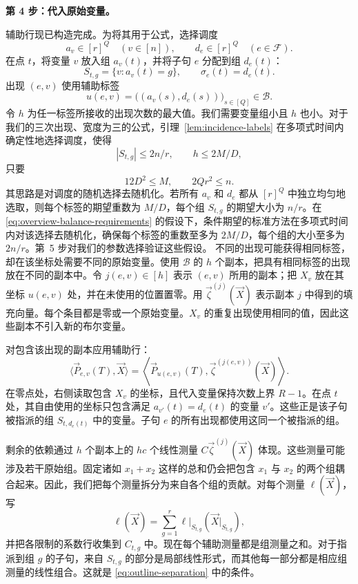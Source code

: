 \documentclass[11pt,reqno]{amsart}
\numberwithin{equation}{section}
\theoremstyle{definition}\newtheorem{definition}[theorem]{定义}
\theoremstyle{remark}\newtheorem{remark}[theorem]{注}
\renewcommand{\le}{\leqslant}
\begin{document}
\medskip\noindent
\textbf{第 4 步：代入原始变量。}\par\nobreak
\smallskip\noindent
辅助行现已构造完成。为将其用于公式，选择调度
\[
 a_v\in[r]^Q\quad(v\in[n]),\qquad
 d_e\in[r]^Q\quad(e\in\mathcal F).
\]
在点 $t$，将变量 $v$ 放入组 $a_v(t)$，并将子句 $e$ 分配到组 $d_e(t)$：
\[
 S_{t,g}=\{v:a_v(t)=g\},\qquad \sigma_e(t)=d_e(t).
\]
出现 $(e,v)$ 使用辅助标签
\[
 u(e,v)=\bigl((a_v(s),d_e(s))\bigr)_{s\in[Q]}\in\mathcal B.
\]
令 $h$ 为任一标签所接收的出现次数的最大值。我们需要变量组小且 $h$ 也小。对于我们的三次出现、宽度为三的公式，引理~\ref{lem:incidence-labels} 在多项式时间内确定性地选择调度，使得
\[
 |S_{t,g}|\le2n/r,\qquad h\le2M/D,
\]
只要
\begin{equation}\label{eq:overview-balance-requirements}
 12D^2\le M,\qquad 2Qr^2\le n.
\end{equation}
其思路是对调度的随机选择去随机化。若所有 $a_v$ 和 $d_e$ 都从 $[r]^Q$ 中独立均匀地选取，则每个标签的期望重数为 $M/D$，每个组 $S_{t,g}$ 的期望大小为 $n/r$。在 \eqref{eq:overview-balance-requirements} 的假设下，条件期望的标准方法在多项式时间内对该选择去随机化，确保每个标签的重数至多为 $2M/D$，每个组的大小至多为 $2n/r$。第~5 步对我们的参数选择验证这些假设。
不同的出现可能获得相同标签，却在该坐标处需要不同的原始变量。使用 $\mathcal B$ 的 $h$ 个副本，把具有相同标签的出现放在不同的副本中。令 $j(e,v)\in[h]$ 表示 $(e,v)$ 所用的副本；把 $X_v$ 放在其坐标 $u(e,v)$ 处，并在未使用的位置置零。用 $\vec\zeta^{(j)}(\vec X)$ 表示副本 $j$ 中得到的填充向量。每个条目都是零或一个原始变量。$X_v$ 的重复出现使用相同的值，因此这些副本不引入新的布尔变量。

对包含该出现的副本应用辅助行：
\begin{equation}\label{eq:overview-transferred-row}
 \langle\vec P_{e,v}(T),\vec X\rangle
 =\left\langle\vec P_{u(e,v)}(T),
                  \vec\zeta^{(j(e,v))}(\vec X)\right\rangle.
\end{equation}
在零点处，右侧读取包含 $X_v$ 的坐标，且代入变量保持次数上界 $R-1$。在点 $t$ 处，其自由使用的坐标只包含满足 $a_{v'}(t)=d_e(t)$ 的变量 $v'$。这些正是该子句被指派的组 $S_{t,d_e(t)}$ 中的变量。子句 $e$ 的所有出现都使用这同一个被指派的组。

剩余的依赖通过 $h$ 个副本上的 $hc$ 个线性测量 $C\vec\zeta^{(j)}(\vec X)$ 体现。这些测量可能涉及若干原始组。固定诸如 $x_1+x_2$ 这样的总和仍会把包含 $x_1$ 与 $x_2$ 的两个组耦合起来。因此，我们把每个测量拆分为来自各个组的贡献。对每个测量 $\ell(\vec X)$，写
\[
 \ell(\vec X)=\sum_{g=1}^r
        \ell|_{S_{t,g}}(\vec X|_{S_{t,g}}),
\]
并把各限制的系数行收集到 $C_{t,g}$ 中。现在每个辅助测量都是组测量之和。对于指派到组 $g$ 的子句，来自 $S_{t,g}$ 的部分是局部线性形式，而其他每一部分都是相应组测量的线性组合。这就是 \eqref{eq:outline-separation} 中的条件。
\end{document}
